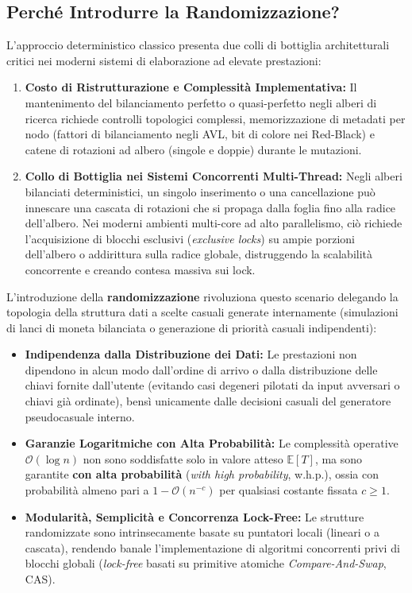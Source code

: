\subsection{Perché Introdurre la Randomizzazione?}
L'approccio deterministico classico presenta due colli di bottiglia architetturali critici nei moderni sistemi di elaborazione ad elevate prestazioni:
\begin{enumerate}
  \item \textbf{Costo di Ristrutturazione e Complessità Implementativa:} Il mantenimento del bilanciamento perfetto o quasi-perfetto negli alberi di ricerca richiede controlli topologici complessi, memorizzazione di metadati per nodo (fattori di bilanciamento negli AVL, bit di colore nei Red-Black) e catene di rotazioni ad albero (singole e doppie) durante le mutazioni.
  \item \textbf{Collo di Bottiglia nei Sistemi Concorrenti Multi-Thread:} Negli alberi bilanciati deterministici, un singolo inserimento o una cancellazione può innescare una cascata di rotazioni che si propaga dalla foglia fino alla radice dell'albero. Nei moderni ambienti multi-core ad alto parallelismo, ciò richiede l'acquisizione di blocchi esclusivi (\textit{exclusive locks}) su ampie porzioni dell'albero o addirittura sulla radice globale, distruggendo la scalabilità concorrente e creando contesa massiva sui lock.
\end{enumerate}

L'introduzione della \textbf{randomizzazione} rivoluziona questo scenario delegando la topologia della struttura dati a scelte casuali generate internamente (simulazioni di lanci di moneta bilanciata o generazione di priorità casuali indipendenti):
\begin{itemize}
  \item \textbf{Indipendenza dalla Distribuzione dei Dati:} Le prestazioni non dipendono in alcun modo dall'ordine di arrivo o dalla distribuzione delle chiavi fornite dall'utente (evitando casi degeneri pilotati da input avversari o chiavi già ordinate), bensì unicamente dalle decisioni casuali del generatore pseudocasuale interno.
  \item \textbf{Garanzie Logaritmiche con Alta Probabilità:} Le complessità operative $\mathcal{O}(\log n)$ non sono soddisfatte solo in valore atteso $\mathbb{E}[T]$, ma sono garantite \textbf{con alta probabilità} (\textit{with high probability}, w.h.p.), ossia con probabilità almeno pari a $1 - \mathcal{O}(n^{-c})$ per qualsiasi costante fissata $c \ge 1$.
  \item \textbf{Modularità, Semplicità e Concorrenza Lock-Free:} Le strutture randomizzate sono intrinsecamente basate su puntatori locali (lineari o a cascata), rendendo banale l'implementazione di algoritmi concorrenti privi di blocchi globali (\textit{lock-free} basati su primitive atomiche \textit{Compare-And-Swap}, CAS).
\end{itemize}

